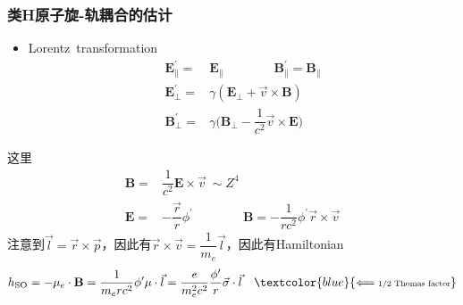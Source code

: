{\frame
{
	\frametitle{类\textrm{H}原子旋-轨耦合的估计}
	\begin{itemize}
		\item \textrm{Lorentz~transformation}
			\begin{displaymath}
				\begin{aligned}
					\mathbf{E}_{\parallel}^{\prime}=&\mathbf{E}_{\parallel}\qquad\qquad \mathbf{B}_{\parallel}^{\prime}=\mathbf{B}_{\parallel}\\
					\mathbf{E}_{\perp}^{\prime}=&\gamma(\mathbf{E}_{\perp}+\vec v\times\mathbf{B})\\
					\mathbf{B}_{\perp}^{\prime}=&\gamma\bigg(\mathbf{B}_{\perp}-\dfrac1{c^2}\vec v\times\mathbf{E}\bigg)
				\end{aligned}
			\end{displaymath}
	\end{itemize}
	这里
	\begin{displaymath}
		\begin{aligned}
			\mathbf{B}=&\dfrac1{c^2}\mathbf{E}\times\vec v~\sim Z^4\\
			\mathbf{E}=&-\dfrac{\vec r}r\phi^{\prime}\qquad\qquad \mathbf{B}=-\dfrac1{rc^2}\phi^{\prime}\vec r\times\vec v
		\end{aligned}
	\end{displaymath}
	注意到$\vec l=\vec r\times\vec p$，因此有$\vec r\times\vec v=\dfrac1{m_e}\vec l$，因此有\textrm{Hamiltonian}
	\begin{displaymath}
		h_{\mathrm{SO}}=-\mu_{e}\cdot\mathbf{B}=\dfrac1{m_erc^2}\phi^{\prime}\mu\cdot\vec l=\dfrac{e}{m_e^2c^2}\dfrac{\phi^{\prime}}r\vec\sigma\cdot\vec l \quad\textcolor{blue}{\Longleftarrow\mbox{\textrm{\fontsize{6.5pt}{5.2pt}\selectfont{1/2~Thomas~factor}}}}
	\end{displaymath}
}

}

